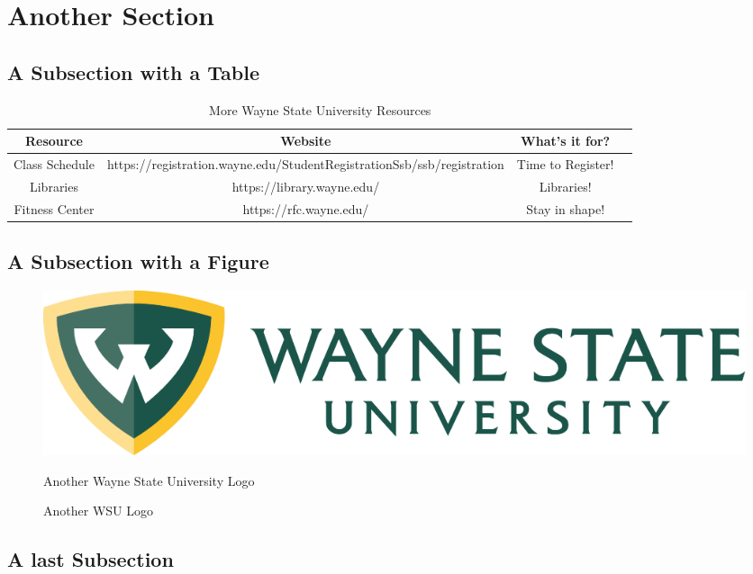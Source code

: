 \section{Another Section}   \label{chap:Related Work}

\subsection{A Subsection with a Table}

\begin{table}[!h]
    \centering	
    \bgroup
    \def\arraystretch{1.00}
    \begin{tabular}{| c | c | c | c |}
          \hline			
          Resource & Website & What's it for? \\ \hline \hline \cline{1-3}
          Class Schedule & https://registration.wayne.edu/StudentRegistrationSsb/ssb/registration & Time to Register! \\ \hline
          Libraries & https://library.wayne.edu/ & Libraries!\\ \hline
          Fitness Center & https://rfc.wayne.edu/ & Stay in shape!\\ \hline
    \end{tabular}
    \egroup
    \caption{More Wayne State University Resources}
    \label{tab:WSUresources2}
\end{table}

\subsection{A Subsection with a Figure}

\begin{figure}[!htbp]
    \centering
    \includegraphics[width=0.50\linewidth]{fig/wsu_primary_horz_color.pdf}
    \caption{Another WSU Logo} Another Wayne State University Logo
    \label{fig:WSUlogo}
\end{figure}

\subsection{A last Subsection}